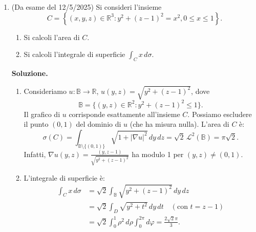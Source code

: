 \begin{enumerate}
		Per l'integrale di superficie:
		\[
		\begin{aligned}
			\int_{\Sigma} |x| y \, d\sigma &= 3 \int_D \frac{|x| \varphi(x,z)}{\sqrt{9 - x^2 - z^2}} \, dx \, dz \\
			&= 3 \int_D |x| \, dx \, dz \\
			&= 3 \int_0^{2\pi} \int_0^{\sqrt{5}} \rho^2 |\cos \theta| \, d\rho \, d\theta \\
			&= 3 \left(\int_0^{2\pi} |\cos \theta| \, d\theta\right) \left(\int_0^{\sqrt{5}} \rho^2 \, d\rho\right) \\
			&= 3 \cdot 4 \cdot \left[\frac{\rho^3}{3}\right]_0^{\sqrt{5}} = 20\sqrt{5}.
		\end{aligned}
		\]
		Infatti, con il cambio di variabile $\theta = \pi/2 + \beta$, si ottiene:
		\[
		\int_0^{2\pi} |\cos \theta| \, d\theta = 4.
		\]
	
	
	\item (Da esame del 12/5/2025) Si consideri l'insieme
	\[
	C = \left\{(x,y,z) \in \mathbb{R}^3 : y^2 + (z - 1)^2 = x^2, 0 \leq x \leq 1\right\}.
	\]
	\begin{enumerate}
		\item Si calcoli l'area di $C$.
		\item Si calcoli l'integrale di superficie $\int_C x \, d\sigma$.
	\end{enumerate}
	
	\textbf{Soluzione.}
		\begin{enumerate}
			\item Consideriamo $u: \mathbb{B} \to \mathbb{R}$, $u(y,z) = \sqrt{y^2 + (z - 1)^2}$, dove
			\[
			\mathbb{B} = \{(y,z) \in \mathbb{R}^2 : y^2 + (z - 1)^2 \leq 1\}.
			\]
			Il grafico di $u$ corrisponde esattamente all'insieme $C$. Possiamo escludere il punto $(0,1)$ del dominio di $u$ (che ha misura nulla). L'area di $C$ è:
			\[
			\sigma(C) = \int_{\mathbb{B} \setminus \{(0,1)\}} \sqrt{1 + |\nabla u|^2} \, dy \, dz = \sqrt{2} \, \mathcal{L}^2(\mathbb{B}) = \pi \sqrt{2}.
			\]
			Infatti, $\nabla u(y,z) = \frac{(y, z - 1)}{\sqrt{y^2 + (z - 1)^2}}$ ha modulo 1 per $(y,z) \neq (0,1)$.
			
			\item L'integrale di superficie è:
			\[
			\begin{aligned}
				\int_C x \, d\sigma &= \sqrt{2} \int_{\mathbb{B}} \sqrt{y^2 + (z - 1)^2} \, dy \, dz \\
				&= \sqrt{2} \int_D \sqrt{y^2 + t^2} \, dy \, dt \quad (\text{con } t = z - 1) \\
				&= \sqrt{2} \int_0^1 \rho^2 \, d\rho \int_0^{2\pi} d\varphi = \frac{2\sqrt{2}\pi}{3}.
			\end{aligned}
			\]
		\end{enumerate}


\end{enumerate}
